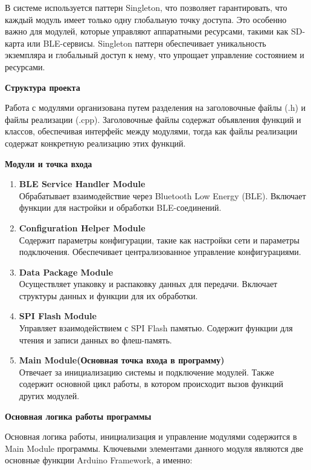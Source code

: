 \documentclass[12pt, russian]{extarticle}
\begin{document}
\begin{spacing}{1.5}
В системе используется паттерн Singleton, что позволяет гарантировать, что каждый модуль имеет только одну глобальную точку доступа. Это особенно важно для модулей, которые управляют аппаратными ресурсами, такими как SD-карта или BLE-сервисы. Singleton паттерн обеспечивает уникальность экземпляра и глобальный доступ к нему, что упрощает управление состоянием и ресурсами.

\par \noindent \textbf{Структура проекта}

Работа с модулями организована путем разделения на заголовочные файлы (.h) и файлы реализации (.cpp). Заголовочные файлы содержат объявления функций и классов, обеспечивая интерфейс между модулями, тогда как файлы реализации содержат конкретную реализацию этих функций.

\par \noindent \textbf{Модули и точка входа}

\begin{enumerate}
    \item \textbf{BLE Service Handler Module} \\
        Обрабатывает взаимодействие через Bluetooth Low Energy (BLE). Включает функции для настройки и обработки BLE-соединений.
    \item \textbf{Configuration Helper Module} \\
        Содержит параметры конфигурации, такие как настройки сети и параметры подключения. Обеспечивает централизованное управление конфигурациями.
    \item \textbf{Data Package Module} \\
        Осуществляет упаковку и распаковку данных для передачи. Включает структуры данных и функции для их обработки.
    \item \textbf{SPI Flash Module} \\
        Управляет взаимодействием с SPI Flash памятью. Содержит функции для чтения и записи данных во флеш-память.
    \item \textbf{Main Module(Основная точка входа в программу)} \\
     Отвечает за инициализацию системы и подключение модулей. Также содержит основной цикл работы, в котором происходит вызов функций других модулей.
\end{enumerate}

\par \noindent \textbf{Основная логика работы программы}

Основная логика работы, инициализация и управление модулями содержится в Main Module программы. Ключевыми элементами данного модуля являются две основные функции Arduino Framework, а именно:


\end{spacing}
\end{document}
